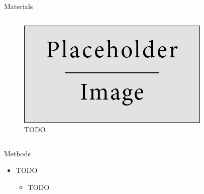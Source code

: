 \documentclass[final,hyperref={pdfpagelabels=false}]{beamer}
\begin{document}
\begin{frame}[t]
\begin{columns}[t]
\begin{column}{.465\textwidth}
\begin{block}{Materials}
\begin{columns}
\begin{column}{.43\textwidth} %
\centering
\begin{figure}
\includegraphics[width=0.8\linewidth]{placeholder.jpg}
\caption{TODO}
\end{figure}
\end{column}
\end{columns} %


\end{block}


\begin{block}{Methods}

\begin{itemize}
\item TODO
\begin{itemize}
\item TODO
\end{itemize}


\end{itemize}
\end{block}
\end{column}
\end{columns}
\end{frame}
\end{document}
